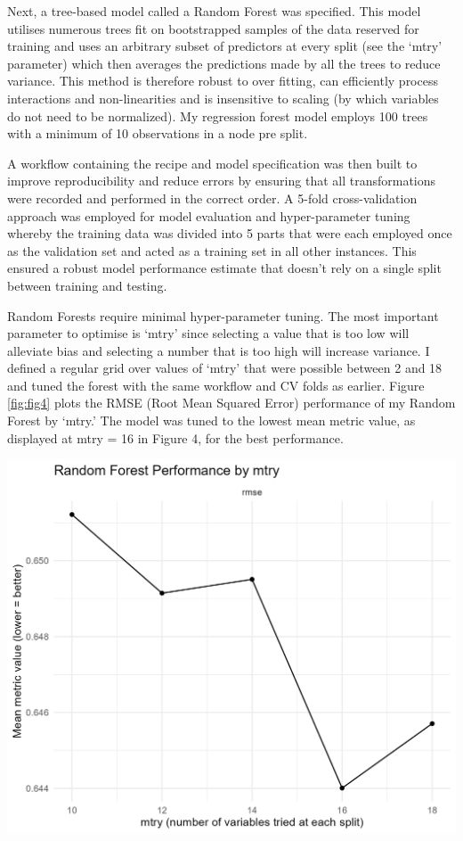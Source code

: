 \documentclass[11pt,preprint]{elsarticle}
\let\origfigure\figure
\let\endorigfigure\endfigure
\renewenvironment{figure}[1][2] {
    \expandafter\origfigure\expandafter[H]
} {
    \endorigfigure
}
\numberwithin{equation}{section}
\numberwithin{figure}{section}
\numberwithin{table}{section}
\begin{document}
Next, a tree-based model called a Random Forest was specified. This
model utilises numerous trees fit on bootstrapped samples of the data
reserved for training and uses an arbitrary subset of predictors at
every split (see the `mtry' parameter) which then averages the
predictions made by all the trees to reduce variance. This method is
therefore robust to over fitting, can efficiently process interactions
and non-linearities and is insensitive to scaling (by which variables do
not need to be normalized). My regression forest model employs 100 trees
with a minimum of 10 observations in a node pre split.

A workflow containing the recipe and model specification was then built
to improve reproducibility and reduce errors by ensuring that all
transformations were recorded and performed in the correct order. A
5-fold cross-validation approach was employed for model evaluation and
hyper-parameter tuning whereby the training data was divided into 5
parts that were each employed once as the validation set and acted as a
training set in all other instances. This ensured a robust model
performance estimate that doesn't rely on a single split between
training and testing.

Random Forests require minimal hyper-parameter tuning. The most
important parameter to optimise is `mtry' since selecting a value that
is too low will alleviate bias and selecting a number that is too high
will increase variance. I defined a regular grid over values of `mtry'
that were possible between 2 and 18 and tuned the forest with the same
workflow and CV folds as earlier. Figure \ref{fig:fig4} plots the RMSE
(Root Mean Squared Error) performance of my Random Forest by `mtry.' The
model was tuned to the lowest mean metric value, as displayed at mtry =
16 in Figure 4, for the best performance.

\begin{figure}[H]

{\centering \includegraphics[width=0.8\linewidth]{writeup/fig4} 

}

\caption{Random Forest Performance by 'mtry'\label{fig:fig4}}\label{fig:fig4}
\end{figure}
\end{document}
